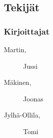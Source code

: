 \subsection*{Tekijät}
\subsubsection*{Kirjoittajat}
\begin{multicols}{2}
\begin{description}
\item[Martin, ] Jussi
\item[Mäkinen, ] Joonas
\item[Jylhä-Ollila, ] Tomi
\end{description}
\end{multicols}

%


